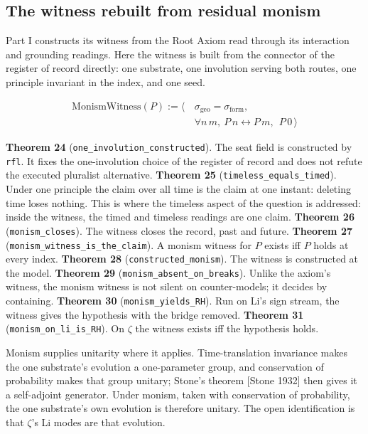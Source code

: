\documentclass[10pt,twocolumn]{article}
\begin{document}
\hypertarget{the-witness-rebuilt-from-residual-monism}{%
\subsection{The witness rebuilt from residual
monism}\label{the-witness-rebuilt-from-residual-monism}}

Part I constructs its witness from the Root Axiom read through its
interaction and grounding readings. Here the witness is built from the
connector of the register of record directly: one substrate, one
involution serving both routes, one principle invariant in the index,
and one seed.

\[\begin{aligned}\mathrm{MonismWitness}(P) := \big\langle\, &\sigma_{\mathrm{geo}} = \sigma_{\mathrm{form}},\\ &\forall n\, m,\ P\,n \leftrightarrow P\,m,\ \ P\,0 \,\big\rangle\end{aligned}\]

\textbf{Theorem 24} (\texttt{one\_involution\_constructed}). The seat
field is constructed by \texttt{rfl}. It fixes the one-involution choice
of the register of record and does not refute the executed pluralist
alternative. \textbf{Theorem 25} (\texttt{timeless\_equals\_timed}).
Under one principle the claim over all time is the claim at one instant:
deleting time loses nothing. This is where the timeless aspect of the
question is addressed: inside the witness, the timed and timeless
readings are one claim. \textbf{Theorem 26} (\texttt{monism\_closes}).
The witness closes the record, past and future. \textbf{Theorem 27}
(\texttt{monism\_witness\_is\_the\_claim}). A monism witness for \(P\)
exists iff \(P\) holds at every index. \textbf{Theorem 28}
(\texttt{constructed\_monism}). The witness is constructed at the model.
\textbf{Theorem 29} (\texttt{monism\_absent\_on\_breaks}). Unlike the
axiom's witness, the monism witness is not silent on counter-models; it
decides by containing. \textbf{Theorem 30}
(\texttt{monism\_yields\_RH}). Run on Li's sign stream, the witness
gives the hypothesis with the bridge removed. \textbf{Theorem 31}
(\texttt{monism\_on\_li\_is\_RH}). On \(\zeta\) the witness exists iff
the hypothesis holds.

Monism supplies unitarity where it applies. Time-translation invariance
makes the one substrate's evolution a one-parameter group, and
conservation of probability makes that group unitary; Stone's theorem
{[}Stone 1932{]} then gives it a self-adjoint generator. Under monism,
taken with conservation of probability, the one substrate's own
evolution is therefore unitary. The open identification is that
\(\zeta\)'s Li modes are that evolution.
\end{document}
